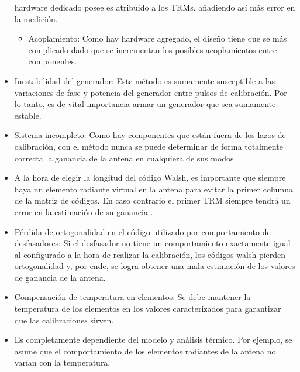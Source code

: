 \begin{itemize}
		hardware dedicado posee es atribuido a los TRMs, añadiendo así más error en la medición.
	\begin{itemize}
		\item Acoplamiento: Como hay hardware agregado, el diseño tiene que se más complicado dado que se incrementan los posibles
			acoplamientos entre componentes.
	\end{itemize}
	\item Inestabilidad del generador: Este método es sumamente susceptible a las variaciones de fase y potencia del generador
		entre pulsos de calibración. Por lo tanto, es de vital importancia armar un generador que sea sumamente estable.
	\item Sistema incompleto: Como hay componentes que están fuera de los lazos de calibración, con el método nunca se puede
		determinar de forma totalmente correcta la ganancia de la antena en cualquiera de sus modos.
	\item A la hora de elegir la longitud del código Walsh, es importante que siempre haya un elemento radiante virtual en la
		antena para evitar la primer columna de la matriz de códigos. En caso contrario el primer TRM siempre tendrá un error en
		la estimación de su ganancia \cite{Wang2010}.
	\item Pérdida de ortogonalidad en el código utilizado por comportamiento de desfasadores: Si el desfasador no tiene un
		comportamiento exactamente igual al configurado a la hora de realizar la calibración, los códigos walsh pierden
		ortogonalidad y, por ende, se logra obtener una mala estimación de los valores de ganancia de la antena.
    \item Compensación de temperatura en elementos: Se debe mantener la temperatura de los elementos en los valores
        caracterizados para garantizar que las calibraciones sirven.
    \item Es completamente dependiente del modelo y análisis térmico. Por ejemplo, se asume que el comportamiento de los
        elementos radiantes de la antena no varían con la temperatura.
\end{itemize}
